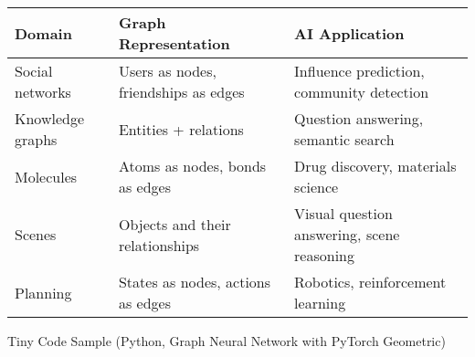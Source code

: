\documentclass[
  letterpaper,
  DIV=11,
  numbers=noendperiod]{scrreprt}
\begin{document}
\begin{longtable}[]{@{}
  >{\raggedright\arraybackslash}p{}
  >{\raggedright\arraybackslash}p{}
  >{\raggedright\arraybackslash}p{}@{}}
\toprule\noalign{}
\begin{minipage}[b]{\linewidth}\raggedright
Domain
\end{minipage} & \begin{minipage}[b]{\linewidth}\raggedright
Graph Representation
\end{minipage} & \begin{minipage}[b]{\linewidth}\raggedright
AI Application
\end{minipage} \\
\midrule\noalign{}
\endhead
\bottomrule\noalign{}
\endlastfoot
Social networks & Users as nodes, friendships as edges & Influence
prediction, community detection \\
Knowledge graphs & Entities + relations & Question answering, semantic
search \\
Molecules & Atoms as nodes, bonds as edges & Drug discovery, materials
science \\
Scenes & Objects and their relationships & Visual question answering,
scene reasoning \\
Planning & States as nodes, actions as edges & Robotics, reinforcement
learning \\
\end{longtable}

Tiny Code Sample (Python, Graph Neural Network with PyTorch Geometric)
\end{document}
